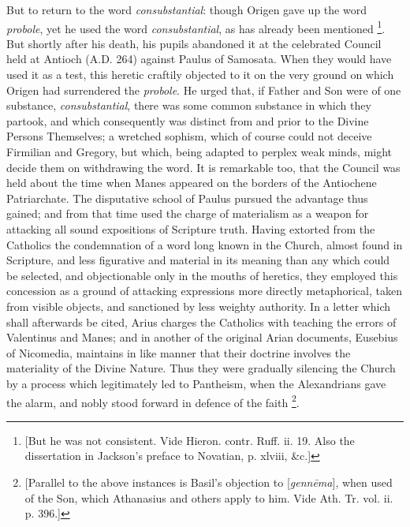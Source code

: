 But to return to the word \emph{consubstantial}: though Origen gave
up the word \emph{probole}, yet he used the word \emph{consubstantial},
as has already been mentioned \footnote{[But he was not consistent. Vide Hieron.
contr. Ruff. ii. 19. Also the dissertation in Jackson's preface to
Novatian, p. xlviii, \&c.]}. But shortly after his death, his pupils abandoned it at the
celebrated Council held at Antioch (A.D.
264) against Paulus of Samosata. When they would have used it as a
test, this heretic craftily objected to it on the very ground on which
Origen had surrendered the \emph{probole}. He urged that, if Father
and Son were of one substance, \emph{consubstantial}, there was some
common substance in which they partook, and which consequently was
distinct from and prior to the Divine Persons Themselves; a wretched
sophism, which of course could not deceive Firmilian and Gregory, but
which, being adapted to perplex weak minds, might decide them on
withdrawing the word. It is remarkable too, that the Council was held
about the time when Manes appeared on the borders of the Antiochene
Patriarchate. The disputative school of Paulus pursued the advantage
thus gained; and from that time used the charge of materialism as a
weapon for attacking all sound expositions of Scripture truth. Having
extorted from the Catholics the condemnation of a word long known in
the Church, almost found in Scripture, and less figurative and
material in its meaning than any which could be selected, and
objectionable only in the mouths of heretics, they employed this
concession as a ground of attacking expressions more directly
metaphorical, taken from visible objects, and sanctioned by less
weighty authority. In a letter which shall afterwards be cited, Arius
charges the Catholics with teaching the errors of Valentinus and
Manes; and in another of the original Arian documents, Eusebius of
Nicomedia, maintains in like manner that their doctrine involves the
materiality of the Divine Nature. Thus they were gradually silencing
the Church by a process which legitimately led to Pantheism,
when the Alexandrians gave the alarm, and nobly stood forward in
defence of the faith \footnote{[Parallel to the above instances is Basil's
objection to [\emph{genn\={e}ma}], when used of the Son, which
Athanasius and others apply to him. Vide Ath. Tr. vol. ii. p. 396.]}.


